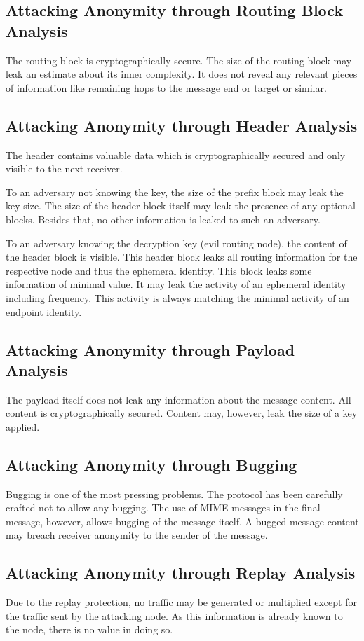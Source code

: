 \subsection{Attacking Anonymity through Routing Block Analysis}
The routing block is cryptographically secure. The size of the routing block may leak an estimate about its inner complexity. It does not reveal any relevant pieces of information like remaining hops to the message end or target or similar.

\subsection{Attacking Anonymity through Header Analysis}
The header contains valuable data which is cryptographically secured and only visible to the next receiver. 

To an adversary not knowing the key, the size of the prefix block may leak the key size. The size of the header block itself may leak the presence of any optional blocks. Besides that, no other information is leaked to such an adversary.

To an adversary knowing the decryption key (evil routing node), the content of the header block is visible. This header block leaks all routing information for the respective node and thus the ephemeral identity. This block leaks some information of minimal value. It may leak the activity of an ephemeral identity including frequency. This activity is always matching the minimal activity of an endpoint identity. 

\subsection{Attacking Anonymity through Payload Analysis}
The payload itself does not leak any information about the message content. All content is cryptographically secured. Content may, however, leak the size of a key applied.

\subsection{Attacking Anonymity through Bugging}
Bugging is one of the most pressing problems. The protocol has been carefully crafted not to allow any bugging. The use of MIME messages in the final message, however, allows bugging of the message itself. A bugged message content may breach receiver anonymity to the sender of the message.

\subsection{Attacking Anonymity through Replay Analysis}
Due to the replay protection, no traffic may be generated or multiplied except for the traffic sent by the attacking node. As this information is already known to the node, there is no value in doing so. 


